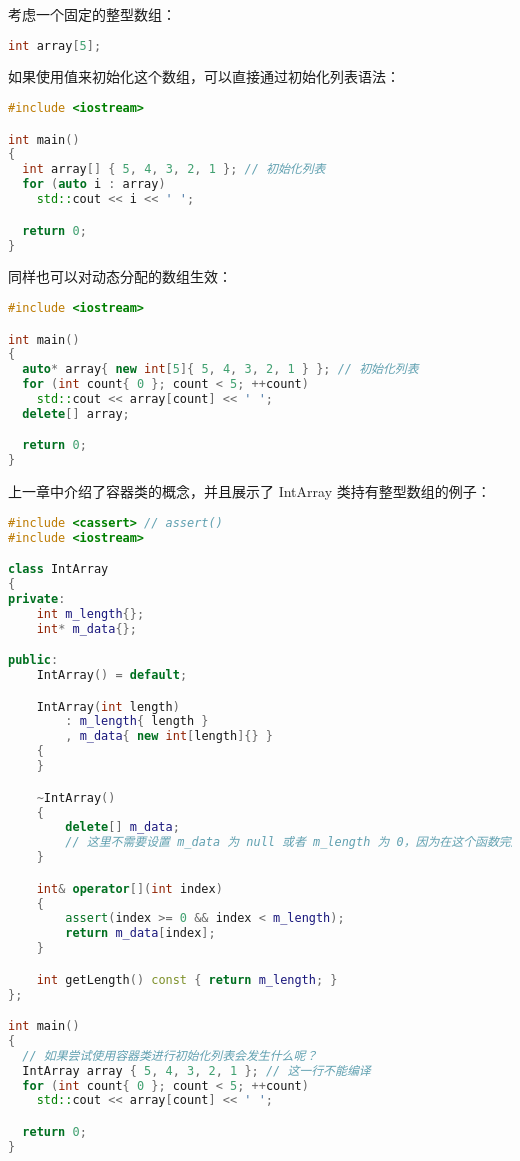 \documentclass[../../LearnCpp.tex]{subfiles}
\begin{document}

考虑一个固定的整型数组：

\begin{lstlisting}[language=C++]
int array[5];
\end{lstlisting}

如果使用值来初始化这个数组，可以直接通过初始化列表语法：

\begin{lstlisting}[language=C++]
#include <iostream>

int main()
{
  int array[] { 5, 4, 3, 2, 1 }; // 初始化列表
  for (auto i : array)
    std::cout << i << ' ';

  return 0;
}
\end{lstlisting}

同样也可以对动态分配的数组生效：

\begin{lstlisting}[language=C++]
#include <iostream>

int main()
{
  auto* array{ new int[5]{ 5, 4, 3, 2, 1 } }; // 初始化列表
  for (int count{ 0 }; count < 5; ++count)
    std::cout << array[count] << ' ';
  delete[] array;

  return 0;
}
\end{lstlisting}

上一章中介绍了容器类的概念，并且展示了 IntArray 类持有整型数组的例子：

\begin{lstlisting}[language=C++]
#include <cassert> // assert()
#include <iostream>

class IntArray
{
private:
    int m_length{};
    int* m_data{};

public:
    IntArray() = default;

    IntArray(int length)
        : m_length{ length }
        , m_data{ new int[length]{} }
    {
    }

    ~IntArray()
    {
        delete[] m_data;
        // 这里不需要设置 m_data 为 null 或者 m_length 为 0，因为在这个函数完成之后，对象会立刻被销毁。
    }

    int& operator[](int index)
    {
        assert(index >= 0 && index < m_length);
        return m_data[index];
    }

    int getLength() const { return m_length; }
};

int main()
{
  // 如果尝试使用容器类进行初始化列表会发生什么呢？
  IntArray array { 5, 4, 3, 2, 1 }; // 这一行不能编译
  for (int count{ 0 }; count < 5; ++count)
    std::cout << array[count] << ' ';

  return 0;
}
\end{lstlisting}
\end{document}
